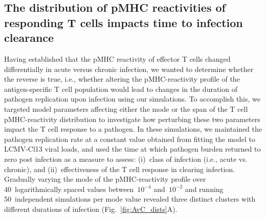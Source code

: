 \subsection{The distribution of pMHC reactivities of responding T cells impacts time to infection clearance}

Having established that the pMHC reactivity of effector T cells changed differentially in acute versus chronic infection, we wanted to determine whether the reverse is true, i.e., whether altering the pMHC-reactivity profile of the antigen-specific T cell population would lead to changes in the duration of pathogen replication upon infection using our simulations. To accomplish this, we targeted model parameters affecting either the mode or the span of the T cell pMHC-reactivity distribution to investigate how perturbing these two parameters impact the T cell response to a pathogen. In these simulations, we maintained the pathogen replication rate at a constant value obtained from fitting the model to LCMV-Cl13 viral loads, and used the time at which pathogen burden returned to zero post infection as a measure to assess: (i)~class of infection (i.e., acute vs. chronic), and (ii)~effectiveness of the T cell response in clearing infection. Gradually varying the mode of the pMHC-reactivity profile over 40~logarithmically spaced values between~$10^{-4}$ and~$10^{-2}$ and running 50~independent simulations per mode value revealed three distinct clusters with different durations of infection (Fig.~\ref{fig:AvC_dists}A).
%
